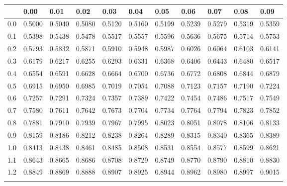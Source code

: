  \begin{tabular}{l|llllllllll}
     & 0.00   & 0.01   & 0.02   & 0.03   & 0.04   & 0.05   & 0.06   & 0.07   & 0.08  & 0.09 \\ \hline
0.0 & 0.5000 & 0.5040 & 0.5080 & 0.5120 & 0.5160 & 0.5199 & 0.5239 & 0.5279 & 0.5319 & 0.5359 \\\arrayrulecolor{light-gray}\hline\arrayrulecolor{black} 
0.1 & 0.5398 & 0.5438 & 0.5478 & 0.5517 & 0.5557 & 0.5596 & 0.5636 & 0.5675 & 0.5714 & 0.5753 \\\arrayrulecolor{light-gray}\hline\arrayrulecolor{black} 
0.2 & 0.5793 & 0.5832 & 0.5871 & 0.5910 & 0.5948 & 0.5987 & 0.6026 & 0.6064 & 0.6103 & 0.6141 \\\arrayrulecolor{light-gray}\hline\arrayrulecolor{black} 
0.3 & 0.6179 & 0.6217 & 0.6255 & 0.6293 & 0.6331 & 0.6368 & 0.6406 & 0.6443 & 0.6480 & 0.6517 \\\arrayrulecolor{light-gray}\hline\arrayrulecolor{black} 
0.4 & 0.6554 & 0.6591 & 0.6628 & 0.6664 & 0.6700 & 0.6736 & 0.6772 & 0.6808 & 0.6844 & 0.6879 \\\arrayrulecolor{light-gray}\hline\arrayrulecolor{black} 
0.5 & 0.6915 & 0.6950 & 0.6985 & 0.7019 & 0.7054 & 0.7088 & 0.7123 & 0.7157 & 0.7190 & 0.7224 \\\arrayrulecolor{light-gray}\hline\arrayrulecolor{black} 
0.6 & 0.7257 & 0.7291 & 0.7324 & 0.7357 & 0.7389 & 0.7422 & 0.7454 & 0.7486 & 0.7517 & 0.7549 \\\arrayrulecolor{light-gray}\hline\arrayrulecolor{black} 
0.7 & 0.7580 & 0.7611 & 0.7642 & 0.7673 & 0.7704 & 0.7734 & 0.7764 & 0.7794 & 0.7823 & 0.7852 \\\arrayrulecolor{light-gray}\hline\arrayrulecolor{black} 
0.8 & 0.7881 & 0.7910 & 0.7939 & 0.7967 & 0.7995 & 0.8023 & 0.8051 & 0.8078 & 0.8106 & 0.8133 \\\arrayrulecolor{light-gray}\hline\arrayrulecolor{black} 
0.9 & 0.8159 & 0.8186 & 0.8212 & 0.8238 & 0.8264 & 0.8289 & 0.8315 & 0.8340 & 0.8365 & 0.8389 \\\arrayrulecolor{light-gray}\hline\arrayrulecolor{black} 
1.0 & 0.8413 & 0.8438 & 0.8461 & 0.8485 & 0.8508 & 0.8531 & 0.8554 & 0.8577 & 0.8599 & 0.8621 \\\arrayrulecolor{light-gray}\hline\arrayrulecolor{black} 
1.1 & 0.8643 & 0.8665 & 0.8686 & 0.8708 & 0.8729 & 0.8749 & 0.8770 & 0.8790 & 0.8810 & 0.8830 \\\arrayrulecolor{light-gray}\hline\arrayrulecolor{black} 
1.2 & 0.8849 & 0.8869 & 0.8888 & 0.8907 & 0.8925 & 0.8944 & 0.8962 & 0.8980 & 0.8997 & 0.9015 \\\arrayrulecolor{light-gray}\hline\arrayrulecolor{black} 

\end{tabular}
